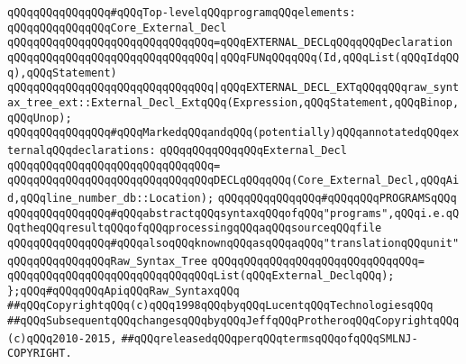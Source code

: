 \newline
\newline
\newline
\verb|qQQqqQQqqQQqqQQq#qQQqTop-levelqQQqprogramqQQqelements:|\newline
\verb|qQQqqQQqqQQqqQQqCore_External_Decl|\newline
\verb|qQQqqQQqqQQqqQQqqQQqqQQqqQQqqQQq=qQQqEXTERNAL_DECLqQQqqQQqDeclaration|\newline
\verb|qQQqqQQqqQQqqQQqqQQqqQQqqQQqqQQq|\verb#|qQQqFUNqQQqqQQq(Id,qQQqList(qQQqIdqQQq),qQQqStatement)#\newline
\verb|qQQqqQQqqQQqqQQqqQQqqQQqqQQqqQQq|\verb#|qQQqEXTERNAL_DECL_EXTqQQqqQQqraw_syntax_tree_ext::External_Decl_ExtqQQq(Expression,qQQqStatement,qQQqBinop,qQQqUnop);#\newline
\newline
\newline
\newline
\verb|qQQqqQQqqQQqqQQq#qQQqMarkedqQQqandqQQq(potentially)qQQqannotatedqQQqexternalqQQqdeclarations:|\newline
\newline
\verb|qQQqqQQqqQQqqQQqExternal_Decl|\newline
\verb|qQQqqQQqqQQqqQQqqQQqqQQqqQQqqQQq=|\newline
\verb|qQQqqQQqqQQqqQQqqQQqqQQqqQQqqQQqDECLqQQqqQQq(Core_External_Decl,qQQqAid,qQQqline_number_db::Location);|\newline
\newline
\verb|qQQqqQQqqQQqqQQq#qQQqqQQqPROGRAMSqQQq|\newline
\verb|qQQqqQQqqQQqqQQq#qQQqabstractqQQqsyntaxqQQqofqQQq"programs",qQQqi.e.qQQqtheqQQqresultqQQqofqQQqprocessingqQQqaqQQqsourceqQQqfile|\newline
\verb|qQQqqQQqqQQqqQQq#qQQqalsoqQQqknownqQQqasqQQqaqQQq"translationqQQqunit"|\newline
\newline
\verb|qQQqqQQqqQQqqQQqRaw_Syntax_Tree|\newline
\verb|qQQqqQQqqQQqqQQqqQQqqQQqqQQqqQQq=|\newline
\verb|qQQqqQQqqQQqqQQqqQQqqQQqqQQqqQQqList(qQQqExternal_DeclqQQq);|\newline
\newline
\newline
\verb|};qQQq#qQQqqQQqApiqQQqRaw_SyntaxqQQq|\newline
\newline
\newline
\verb|##qQQqCopyrightqQQq(c)qQQq1998qQQqbyqQQqLucentqQQqTechnologiesqQQq|\newline
\verb|##qQQqSubsequentqQQqchangesqQQqbyqQQqJeffqQQqProtheroqQQqCopyrightqQQq(c)qQQq2010-2015,|\newline
\verb|##qQQqreleasedqQQqperqQQqtermsqQQqofqQQqSMLNJ-COPYRIGHT.|\newline

